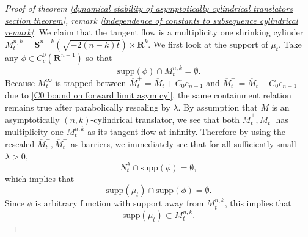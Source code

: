 \documentclass[pdflatex,sn-mathphys-num]{sn-jnl}%
\begin{document}
\begin{proof}[Proof of theorem \ref{dynamical stability of asymptotically cylindrical translators section theorem}, remark \ref{independence of constants to subsequence cylindrical remark}]
We claim that the tangent flow is a multiplicity one shrinking cylinder $M^{n,k}_{t} = \mathbf{S}^{n-k}(\sqrt{-2(n-k)t})\times \mathbf{R}^k$. We first look at the support of $\mu_t$. Take any $\phi \in C_c^0(\mathbf{R}^{n+1})$ so that 
\begin{equation}
    \text
    {supp}(\phi) \cap M^{n,k}_t = \emptyset.
\end{equation}
Because $M^{\infty}_t$ is trapped between $\overline{M}^+_t = \overline{M}_t + C_0e_{n+1}$ and $\overline{M}^-_t = \overline{M}_t   - C_0e_{n+1}$ due to \eqref{C0 bound on forward limit asym cyl}, the same containment relation remains true after parabolically rescaling by $\lambda$. By assumption that $\overline{M}$ is an asymptotically $(n,k)$-cylindrical translator, we see that both $\overline{M}^+_t, \overline{M}^-_t$ has multiplicity one $M^{n,k}_t$ as its tangent flow at infinity. Therefore by using the rescaled $\overline{M}^+_t, \overline{M}^-_t$ as barriers, we immediately see that for all sufficiently small $\lambda > 0$, 
\begin{equation}
    N^{\lambda}_t \cap \text{supp}(\phi) = \emptyset,
\end{equation}
which implies that 
\begin{equation}
    \text{supp}(\mu_t) \cap \text{supp}(\phi) = \emptyset.
\end{equation}
Since $\phi$ is arbitrary function with support away from $M^{n,k}_t$, 
this implies that 
\begin{equation}
    \text{supp}(\mu_t) \subset M^{n,k}_t.
\end{equation}


\end{proof}
\end{document}
